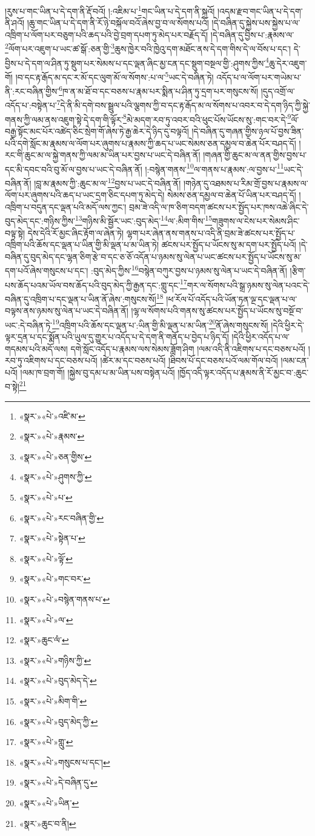 །རུས་པ་གང་ཡིན་པ་དེ་དག་ནི་རྡོ་བའོ། །:འཇིམ་པ་\footnote{«སྣར་»«པེ་»འཛི་མ་}གང་ཡིན་པ་དེ་དག་ནི་སྐྲའོ། །འདམ་རྫབ་གང་ཡིན་པ་དེ་དག་ནི་ཤའོ། །ཆུ་གང་ཡིན་པ་དེ་དག་ནི་རོ་ཉེ་བསྐོལ་བའོ་ཞེས་བྱ་བ་ལ་སོགས་པའོ། །དེ་བཞིན་དུ་སྐྱེས་པས་སྐྱེས་པ་ལ་འཁྲིག་པ་ལོག་པར་བཅུག་པའི་ཆད་པའི་བྱེ་བྲག་དཔག་ཏུ་མེད་པར་བརྗོད་དོ། །དེ་བཞིན་དུ་བྱིས་པ་:རྣམས་ལ་\footnote{«སྣར་»«པེ་»རྣམས་}ལོག་པར་འཇུག་པ་ཡང་ཚ་སྒོ་:ཅན་གྱི་\footnote{«སྣར་»«པེ་»ཅན་གྱིས་}ཆུས་ཁྱེར་བའི་ཁྱེའུ་དག་མཐོང་ནས་དེ་དག་གིས་དེ་ལ་བོས་པ་དང་། དེ་བྱིས་པ་དེ་དག་ལ་ཤིན་ཏུ་སྡུག་པར་སེམས་པ་དང་ལྡན་ཞིང་མྱ་ངན་དང་སྡུག་བསྔལ་གྱི་:ཤུགས་ཀྱིས་\footnote{«སྣར་»«པེ་»ཤུགས་ཀྱི་}ཆུ་དེར་འཇུག་གོ། །བ་དང་རྟ་རྒོད་མ་དང་ར་མོ་དང་ལུག་མོ་ལ་སོགས་:པ་ལ་\footnote{«སྣར་»«པེ་»པ་}ཡང་དེ་བཞིན་ཏེ། འདོད་པ་ལ་ལོག་པར་གཡེམ་པ་ནི་:རང་བཞིན་གྱིས་\footnote{«སྣར་»«པེ་»རང་བཞིན་གྱི་}ཁ་ན་མ་ཐོ་བ་དང་བཅས་པ་རྣམ་པར་སྨིན་པ་ཤིན་ཏུ་དྲག་པར་གསུངས་སོ། །དུད་འགྲོ་ལ་འདོད་པ་:བསྟེན་པ་\footnote{«སྣར་»«པེ་»སྟེན་པ་}དེ་ནི་མི་དགེ་བས་སྦྲུལ་པའི་ལྕགས་ཀྱི་བ་དང་རྟ་རྒོད་མ་ལ་སོགས་པ་འབར་བ་དེ་དག་ཉིད་ཀྱི་སྐྱེ་གནས་ཀྱི་ལམ་ནས་འཇུག་སྟེ་དེ་དག་གི་ལྟོར་\footnote{«སྣར་»«པེ་»ལྟོ་}མེ་མདག་རབ་ཏུ་འབར་བའི་ཕུང་པོས་ཡོངས་སུ་:གང་བར་དེ་\footnote{«སྣར་»«པེ་»གང་བར་}ལོ་བརྒྱ་སྟོང་མང་པོར་འཚེད་ཅིང་སྲེག་གོ་ཞེས་ཏེ་རྒྱ་ཆེར་དེ་ཉིད་དུ་བལྟའོ། །དེ་བཞིན་དུ་གཞན་གྱིས་ཉལ་པོ་བྱས་ཟིན་པའི་དགེ་སློང་མ་རྣམས་ལ་ལོག་པར་ཞུགས་པ་རྣམས་ཀྱི་ཆད་པ་ཡང་སེམས་ཅན་དམྱལ་བ་ཆེན་པོར་བཤད་དོ། །རང་གི་ཆུང་མ་ལ་སྐྱེ་གནས་ཀྱི་ལམ་མ་ཡིན་པར་བྱས་པ་ཡང་དེ་བཞིན་ནོ། །གཞན་གྱི་ཆུང་མ་ལ་ནན་གྱིས་བྱས་པ་དང་མི་དབང་བའི་བུ་མོ་ལ་བྱས་པ་ཡང་དེ་བཞིན་ནོ། །:བསྙེན་གནས་\footnote{«སྣར་»«པེ་»བསྙེན་གནས་པ་}ལ་གནས་པ་རྣམས་:ལ་བྱས་པ་\footnote{«སྣར་»«པེ་»ལ་}ཡང་དེ་བཞིན་ནོ། །བླ་མ་རྣམས་ཀྱི་:ཆུང་མ་ལ་\footnote{«སྣར་»ཆུང་ལཾ་}བྱས་པ་ཡང་དེ་བཞིན་ནོ། །གཉེན་དུ་འཐམས་པ་རིམ་གྲོ་བྱས་པ་རྣམས་ལ་ལོག་པར་ཞུགས་པའི་ཆད་པ་ཡང་དྲག་ཅིང་དཔག་ཏུ་མེད་དེ། སེམས་ཅན་དམྱལ་བ་ཆེན་པོ་ཡིན་པར་བཤད་དོ། །འཁྲིག་པ་བདུན་དང་ལྡན་པའི་མདོ་ལས་ཀྱང་། བྲམ་ཟེ་འདི་ལ་ཁ་ཅིག་བདག་ཚངས་པར་སྤྱོད་པར་ཁས་འཆེ་ཞིང་དེ་བུད་མེད་དང་:གཉིས་ཀྱིས་\footnote{«སྣར་»«པེ་»གཉིས་ཀྱི་}གཉིས་མི་སྦྱོར་ཡང་:བུད་མེད་\footnote{«སྣར་»«པེ་»བུད་མེད་དེ་}ལ་:མིག་གིས་\footnote{«སྣར་»«པེ་»མིག་གི་}གཟུགས་ལ་ངེས་པར་སེམས་ཤིང་བལྟ་སྟེ། དེས་དེའི་རོ་མྱང་ཞིང་རྟོག་ལ་ཞེན་ཏེ། ལྷག་པར་ཞེན་ནས་གནས་པ་འདི་ནི་བྲམ་ཟེ་ཚངས་པར་སྤྱོད་པ་འཁྲིག་པའི་ཆོས་དང་ལྡན་པ་ཡིན་གྱི་མི་ལྡན་པ་མ་ཡིན་ཏེ། ཚངས་པར་སྤྱོད་པ་ཡོངས་སུ་མ་དག་པར་སྤྱོད་པའོ། །དེ་བཞིན་དུ་བུད་མེད་དང་ལྷན་ཅིག་རྩེ་བ་དང་ཅ་ཅོ་འདོན་པ་ཉམས་སུ་ལེན་པ་ཡང་ཚངས་པར་སྤྱོད་པ་ཡོངས་སུ་མ་དག་པའོ་ཞེས་གསུངས་པ་དང་། :བུད་མེད་ཀྱིས་\footnote{«སྣར་»«པེ་»བུད་མེད་ཀྱི་}བསྙེན་བཀུར་བྱས་པ་ཉམས་སུ་ལེན་པ་ཡང་དེ་བཞིན་ནོ། །རྩིག་པས་ཆོད་པའམ་ཡོལ་བས་ཆོད་པའི་བུད་མེད་ཀྱི་རྒྱན་དང་:གླུ་དང་\footnote{«སྣར་»«པེ་»གླུ་}གར་ལ་སོགས་པའི་སྒྲ་ཉམས་སུ་ལེན་པའང་དེ་བཞིན་དུ་འཁྲིག་པ་དང་ལྡན་པ་ཡིན་ནོ་ཞེས་:གསུངས་སོ།\footnote{«སྣར་»«པེ་»གསུངས་པ་དང་།} །ཕ་རོལ་པོ་འདོད་པའི་ཡོན་ཏན་ལྔ་དང་ལྡན་པ་ལ་བལྟས་ནས་ཉམས་སུ་ལེན་པ་ཡང་དེ་བཞིན་ནོ། །ལྷ་ལ་སོགས་པའི་གནས་སུ་ཚངས་པར་སྤྱོད་པ་ཡོངས་སུ་བསྔོ་བ་ཡང་:དེ་བཞིན་ཏེ་\footnote{«སྣར་»«པེ་»དེ་བཞིན་དུ་}འཁྲིག་པའི་ཆོས་དང་ལྡན་པ་:ཡིན་གྱི་མི་ལྡན་པ་མ་ཡིན་\footnote{«སྣར་»«པེ་»ཡིན་}ནོ་ཞེས་གསུངས་སོ། །དེའི་ཕྱིར་དེ་ལྟར་དྲན་པ་དང་སྨོན་པའི་ཡུལ་དུ་གྱུར་པ་འདོད་པ་དེ་དག་ནི་གནོད་པ་བྱེད་པ་ཉིད་དོ། །དེའི་ཕྱིར་འདོད་པ་ལ་གདམས་པའི་མདོ་ལས། དགེ་སློང་འདོད་པ་རྣམས་ལས་སེམས་ཟློག་ཤིག །ལམ་འདི་ནི་འཇིགས་པ་དང་བཅས་པའོ། །རབ་ཏུ་འཇིགས་པ་དང་བཅས་པའོ། །ཚེར་མ་དང་བཅས་པའོ། །ཐིབས་པོ་དང་བཅས་པའོ་ལམ་གོལ་བའོ། །ལམ་ངན་པའོ། །ལམ་ཁ་བྲག་གོ། །སྐྱེས་བུ་དམ་པ་མ་ཡིན་པས་བསྟེན་པའོ། །ཁྱོད་འདི་ལྟར་འདོད་པ་རྣམས་ནི་རོ་མྱང་བ་:ཆུང་བ་སྟེ།\footnote{«སྣར་»ཆུང་བ་ནི།} 